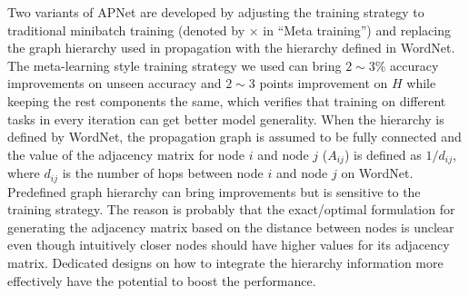 \documentclass[letterpaper]{article}
\begin{document}
Two variants of APNet are developed by adjusting the training strategy to traditional minibatch training (denoted by $\times$ in ``Meta training'') and replacing the graph hierarchy used in propagation with the hierarchy defined in WordNet.
The meta-learning style training strategy we used can bring $2 \sim 3\%$ accuracy improvements on unseen accuracy and $2 \sim 3$ points improvement on $H$ while keeping the rest components the same, which verifies that training on different tasks in every iteration can get better model generality.
When the hierarchy is defined by WordNet, the propagation graph is assumed to be fully connected and the value of the adjacency matrix for node $i$ and node $j$ ($A_{ij}$) is defined as $1/d_{ij}$, where $d_{ij}$ is the number of hops between node $i$ and node $j$ on WordNet.
Predefined graph hierarchy can bring improvements but is sensitive to the training strategy.
The reason is probably that the exact/optimal formulation for generating the adjacency matrix based on the distance between nodes is unclear even though intuitively closer nodes should have higher values for its  adjacency matrix.
Dedicated designs on how to integrate the hierarchy information more effectively have the potential to boost the performance.




\begin{table}[t!]
\centering
\caption{
Ablations and performance comparisons on variants of APNet on AWA2.
}
\label{table:ablation}
\end{table}
\end{document}
